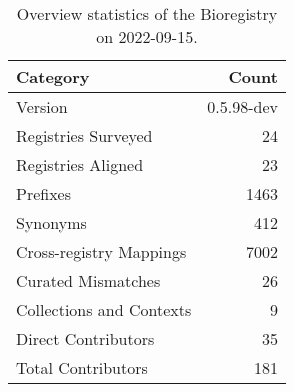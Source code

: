 \begin{table}
\centering
\caption{Overview statistics of the Bioregistry on 2022-09-15.}
\label{tab:bioregistry-summary}
\begin{tabular}{lr}
\toprule
                Category &      Count \\
\midrule
                 Version & 0.5.98-dev \\
     Registries Surveyed &         24 \\
      Registries Aligned &         23 \\
                Prefixes &       1463 \\
                Synonyms &        412 \\
 Cross-registry Mappings &       7002 \\
      Curated Mismatches &         26 \\
Collections and Contexts &          9 \\
     Direct Contributors &         35 \\
      Total Contributors &        181 \\
\bottomrule
\end{tabular}
\end{table}
